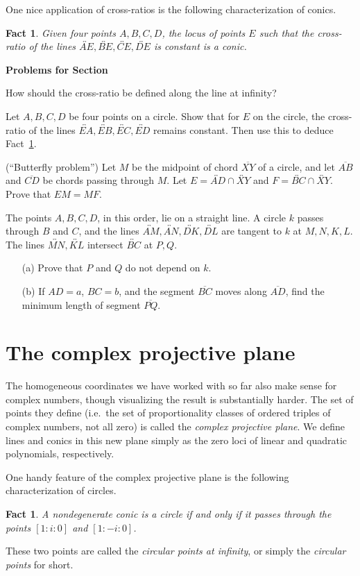 \documentclass[12pt]{book}
\newcounter{exc}
\numberwithin{exc}{section}
\numberwithin{figure}{section}
\newenvironment{exer}{\vspace{0.1in}
\noindent \textbf{Problems for Section~\thesection} \vspace{0.1in}
\begin{list}{\arabic{exc}.}{\usecounter{exc}}}{\end{list}}
\newtheorem{fact}[theorem]{Fact}
\numberwithin{equation}{theorem}
\def\ii{\item}
\def\line#1{\overleftrightarrow{#1}}
\def\seg#1{\overline{#1}}
\begin{document}
One nice application of cross-ratios is the following characterization 
of conics.
\begin{fact} \label{fact:conic cross-ratio}
Given four points $A,B,C,D$, the locus of points $E$ such that the 
cross-ratio of the lines $\line{AE}, \line{BE}, \line{CE}, \line{DE}$ 
is constant is a conic.
\end{fact}

\begin{exer}
\ii
How should the cross-ratio be defined along the line at infinity?
\ii
Let $A,B,C,D$ be four points on a circle. Show that for $E$ on the 
circle, the cross-ratio of the lines $\line{EA}, \line{EB}, \line{EC}, 
\line{ED}$ remains constant. Then 
use this to deduce Fact~\ref{fact:conic cross-ratio}.
\ii (``Butterfly problem'')
Let $M$ be the midpoint of chord $\seg{XY}$ of a circle, and
let $\seg{AB}$ and $\seg{CD}$ be chords passing through $M$. Let $E = 
\line{AD} \cap \line{XY}$ 
and $F = \line{BC} \cap \line{XY}$. Prove that $EM=MF$.
\ii
The points $A,B,C,D$, in this order, lie on a
straight line.  A circle $k$ passes through $B$ and $C$, and 
the lines $\line{AM}, \line{AN}, \line{DK}, \line{DL}$ 
are tangent to $k$ at $M,N,K,L$.
The lines $\line{MN}, \line{KL}$ intersect $\line{BC}$ at $P, Q$.
\begin{enumerate}
\item[(a)] Prove that $P$ and $Q$ do not depend on $k$.
\item[(b)] If $AD=a$, $BC=b$, and the segment $\seg{BC}$ moves along
$\seg{AD}$, find the minimum length of segment $\seg{PQ}$.
\end{enumerate}
\end{exer}

\section{The complex projective plane}
\label{sec:alggeo}

The homogeneous coordinates we have worked with so far also make 
sense for complex numbers, though visualizing the result is 
substantially harder. The set of points they define (i.e.\ the set 
of proportionality classes of ordered triples of complex numbers, not all 
zero) is called the \emph{complex projective plane}. 
We define lines 
and conics in this new plane simply as the zero loci of linear and 
quadratic polynomials, respectively.

One handy feature of the complex projective plane is the
following characterization of circles.
\begin{fact}
A nondegenerate conic is a circle if and only if it passes
through the points $[1:i:0]$ and $[1:-i:0]$. 
\end{fact}
These two points are called the \emph{circular points at infinity}, 
or simply the \emph{circular points} for short.
\end{document}
